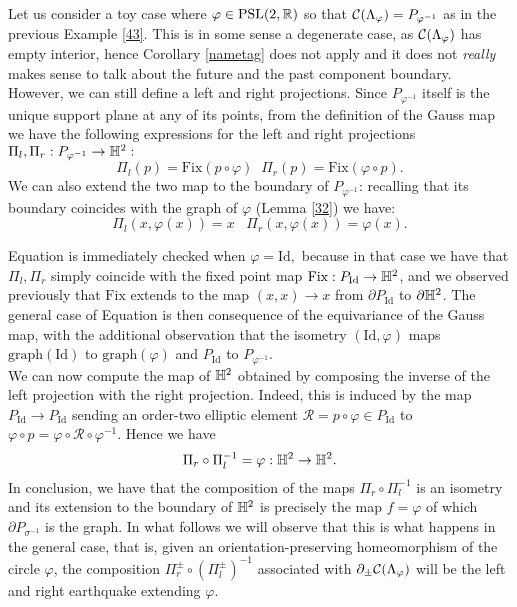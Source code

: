 \begin{example}\label{413} Let us consider a toy case where $\varphi\in\text{PSL}(2,\mathbb{R})$ so that $\mathcal{C}(\Lambda_\varphi)=P_{\varphi^{-1}}$ as in the previous Example \ref{43}. This is in some sense a degenerate case, as $\mathcal{C}(\Lambda_\varphi)$ has empty interior, hence Corollary \ref{nametag} does not apply and it does not \textit{really} makes sense to talk about the future and the past component boundary. However, we can still define a left and right projections. Since $P_{\varphi^{-1}}$ itself is the unique support plane at any of its points, from the definition of the Gauss map we have the following expressions for the left and right projections $\Pi_l,\Pi_r:P_{\varphi^{-1}}\to\mathbb{H}^2:$
\begin{equation}
    \Pi_l(p)=\text{Fix}(p\circ\varphi)\;\;\Pi_r(p)=\text{Fix}(\varphi\circ p).
\end{equation}   
We can also extend the two map to the boundary of $P_{\varphi^{-1}}$: recalling that its boundary coincides with the graph of $\varphi$ (Lemma \ref{32}) we have: 
\begin{equation}\label{simproj}
    \Pi_l(x,\varphi(x))=x \;\;\;\Pi_r(x,\varphi(x))=\varphi(x). 
\end{equation}

Equation  is immediately checked when $\varphi=\text{Id},$ because in that case we have that $\Pi_l,\Pi_r$ simply coincide with the fixed point map $\text{Fix}:P_{\text{Id}}\to\mathbb{H}^2$, and we observed previously that $\text{Fix}$ extends to the map $(x,x)\to x$ from $\partial P_{\text{Id}}$ to $\partial\mathbb{H}^2$. The general case of Equation  is then consequence of the equivariance of the Gauss map, with the additional observation that the isometry $(\text{Id},\varphi)$ maps $\text{graph}(\text{Id})$ to $\text{graph}(\varphi)$ and $P_\text{Id}$ to $P_{\varphi^{-1}}$. \\
We can now compute the map of $\mathbb{H}^2$ obtained by composing the inverse of the left projection with the right projection. Indeed, this is induced by the map $P_{\text{Id}}\to P_\text{Id}$ sending an order-two elliptic element $\mathcal{R}=p\circ\varphi\in P_{\text{Id}}$ to $\varphi\circ p=\varphi\circ\mathcal{R}\circ\varphi^{-1}$. Hence we have   
\begin{equation}\label{composition}
    \Pi_r\circ\Pi_l^{-1}=\varphi:\mathbb{H}^2\to\mathbb{H}^2.
\end{equation}
In conclusion, we have that the composition of the maps $\Pi_r\circ\Pi_l^{-1}$ is an isometry and its extension to the boundary of $\mathbb{H}^2$ is precisely the map $f=\varphi$ of which $\partial P_{\sigma^{-1}}$ is the graph. In what follows we will observe that this is what happens in the general case, that is, given an orientation-preserving homeomorphism of the circle $\varphi$, the composition $\Pi_r^\pm\circ(\Pi_l^\pm)^{-1}$ associated with $\partial_\pm\mathcal{C}(\Lambda_\varphi)$ will be the left and right earthquake extending $\varphi$.
\end{example}

